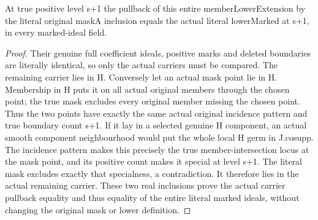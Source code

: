 \begin{theorem}
\label{hir:member-lower-extension-actual-mask-identity}
\leanok
At true positive level s+1 the pullback of this entire memberLowerExtension by
the literal original maskA inclusion equals the actual literal lowerMarked
at s+1, in every marked-ideal field.
\end{theorem}
\begin{proof}
Their genuine full coefficient ideals, positive marks and deleted boundaries
are literally identical, so only the actual carriers must be compared. The
remaining carrier lies in H. Conversely let an actual mask point lie in H.
Membership in H puts it on all actual original members through the chosen
point; the true mask excludes every original member missing the chosen point.
Thus the two points have exactly the same actual original incidence pattern
and true boundary count s+1. If it lay in a selected genuine H component, an
actual smooth component neighbourhood would put the whole local H germ in
J.cosupp. The incidence pattern makes this precisely the true member-intersection
locus at the mask point, and its positive count makes it special at level s+1.
The literal mask excludes exactly that specialness, a contradiction. It
therefore lies in the actual remaining carrier. These two real inclusions prove
the actual carrier pullback equality and thus equality of the entire literal
marked ideals, without changing the original mask or lower definition.
\end{proof}

